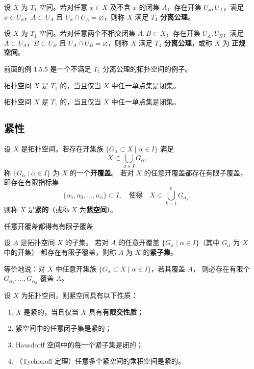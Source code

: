 \begin{definition}[$T_3$ 分离公理]
设 $X$ 为 $T_1$ 空间。若对任意 $x\in X$ 及不含 $x$ 的闭集 $A$，存在开集 $U_x,U_A$，满足 $x\in U_x$，$A\subset U_A$ 且 $U_x\cap U_A=\varnothing$，则称 $X$ 满足 \textbf{$T_3$ 分离公理}。
\end{definition}

\begin{definition}[$T_4$ 分离公理]
设 $X$ 为 $T_1$ 空间。若对任意两个不相交闭集 $A,B\subset X$，存在开集 $U_A,U_B$，满足 $A\subset U_A$，$B\subset U_B$ 且 $U_A\cap U_B=\varnothing$，则称 $X$ 满足 \textbf{$T_4$ 分离公理}，或称 $X$ 为 \textbf{正规空间}。
\end{definition}

\noindent
前面的例 1.5.5 是一个不满足 $T_1$ 分离公理的拓扑空间的例子。
\begin{theorem}[定理 1.5.6]
拓扑空间 $X$ 是 $T_1$ 的，当且仅当 $X$ 中任一单点集是闭集。
\end{theorem}
\begin{theorem}[定理 1.5.6]
拓扑空间 $X$ 是 $T_1$ 的，当且仅当 $X$ 中任一单点集是闭集。
\end{theorem}
\subsection{紧性}
\begin{definition}[紧空间]
设 $X$ 是拓扑空间。若存在开集族 $\{G_\alpha \subset X \mid \alpha \in I\}$ 满足
\[
X \subset \bigcup_{\alpha \in I} G_\alpha,
\]
称 $\{G_\alpha \mid \alpha \in I\}$ 为 $X$ 的一个\textbf{开覆盖}。  
若对 $X$ 的任意开覆盖都存在有限子覆盖，即存在有限指标集
\[
\{\alpha_1,\alpha_2,\dots,\alpha_n\}\subset I,
\quad 使得\quad
X \subset \bigcup_{k=1}^n G_{\alpha_k},
\]
则称 $X$ 是\textbf{紧的}（或称 $X$ 为\textbf{紧空间}）。
\end{definition}
任意开覆盖都得有有限子覆盖
\begin{definition}[紧集]
设 $A$ 是拓扑空间 $X$ 的子集。  
若对 $A$ 的任意开覆盖 $\{G_\alpha \mid \alpha \in I\}$（其中 $G_\alpha$ 为 $X$ 中的开集）  
都存在有限子覆盖，则称 $A$ 为 $X$ 的\textbf{紧子集}。  

等价地说：对 $X$ 中任意开集族 $\{G_\alpha \subset X \mid \alpha \in I\}$，若其覆盖 $A$，  
则必存在有限个 $G_{\alpha_1},\dots,G_{\alpha_n}$ 覆盖 $A$。
\end{definition}
\begin{theorem}[紧空间的基本性质]
设 $X$ 为拓扑空间，则紧空间具有以下性质：
\begin{enumerate}
  \item $X$ 是紧的，当且仅当 $X$ 具有\textbf{有限交性质}；
  \item 紧空间中的任意闭子集是紧的；
  \item Hausdorff 空间中的每一个紧子集是闭的；
  \item （Tychonoff 定理）任意多个紧空间的乘积空间是紧的。
\end{enumerate}

\end{theorem}

